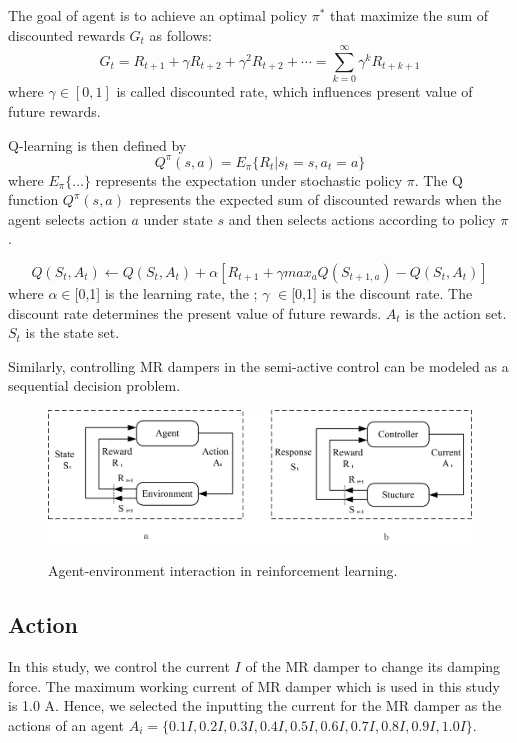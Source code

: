 The goal of agent is to achieve an optimal policy $\pi^*$ that maximize the sum of discounted rewards $G_t$ as follows:
\begin{equation}
G_{t}=R_{t+1}+\gamma R_{t+2}+\gamma^2 R_{t+2}+\cdots=\sum_{k=0}^{\infty} \gamma^{k} R_{t+k+1}
\end{equation}
where $\gamma \in [0,1]$ is called discounted rate, which influences present value of future rewards. 

Q-learning is then defined by 
\begin{equation}Q^\pi(s,a)=E_{\pi}\{R_t|s_t=s,a_t=a\}\end{equation}
where $E_\pi\{\dots\}$ represents the expectation under stochastic policy $\pi$. The Q function $Q^\pi(s,a)$ represents the expected sum of discounted rewards when the agent selects action $a$ under state $s$ and then selects actions according to policy $\pi$. 


\begin{equation}Q(S_t,A_t) \leftarrow Q(S_t,A_t)+\alpha [R_{t+1} + \gamma max_{a}Q(S_{t+1,a})-Q(S_t,A_t)]\end{equation}
where $\alpha \in$[0,1] is the learning rate, the ; $\gamma$ $\in$[0,1] is the discount rate. The discount rate determines the present value of future rewards. $A_t$ is the action set. $S_t$ is the state set.


Similarly, controlling MR dampers in the semi-active control can be modeled as a sequential decision problem. 

\begin{figure}[!h]
\centering
{\includegraphics[width=1.0\textwidth]{interaction.jpg}} 
\caption{Agent-environment interaction in reinforcement learning.} 
\label{interaction} 
\end{figure} 
\subsection{Action}

In this study, we control the current $I$ of the MR damper to change its damping force. The maximum working current of MR damper which is used in this study is 1.0 A. Hence, we selected the inputting the current for the MR damper as the actions of an agent $A_i=\{0.1I, 0.2I, 0.3I, 0.4I, 0.5I, 0.6I, 0.7I, 0.8I, 0.9I, 1.0I\}$. 

